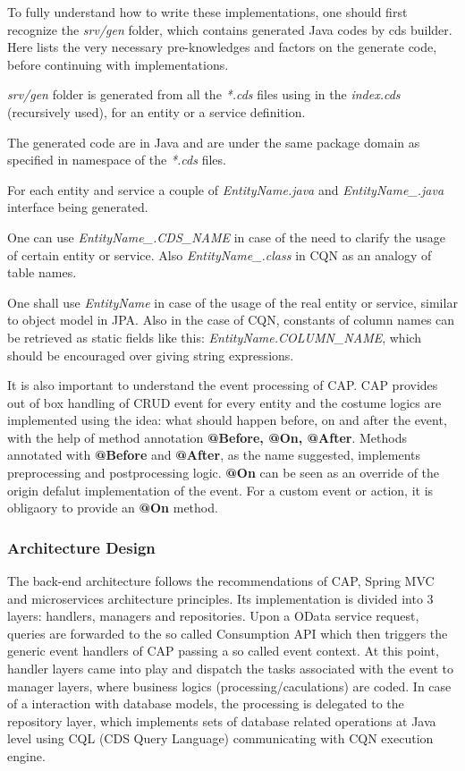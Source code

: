 To fully understand how to write these implementations, one should first recognize the \textit{srv/gen} folder, which contains generated Java codes by cds builder. Here lists the very necessary pre-knowledges and factors on the generate code, before continuing with implementations. 
\begin{compactenum}
	\item \textit{srv/gen} folder is generated from all the \textit{*.cds} files using in the \textit{index.cds} (recursively used), for an entity or a service definition.
    \item The generated code are in Java and are under the same package domain as specified in namespace of the \textit{*.cds} files.
    \item For each entity and service a couple of \textit{EntityName.java} and \textit{EntityName\_.java} interface being generated. 
    \item One can use \textit{EntityName\_.CDS\_NAME} in case of the need to clarify the usage of certain entity or service. Also \textit{EntityName\_.class} in CQN as an analogy of table names. 
    \item One shall use \textit{EntityName} in case of the usage of the real entity or service, similar to object model in JPA. Also in the case of CQN, constants of column names can be retrieved as static fields like this: \textit{EntityName.COLUMN\_NAME}, which should be encouraged over giving string expressions.
\end{compactenum}

\bigskip
It is also important to understand the event processing of CAP. CAP provides out of box handling of CRUD event for every entity and the costume logics are implemented using the idea: what should happen before, on and after the event, with the help of method annotation \textbf{@Before, @On, @After}. Methods annotated with \textbf{@Before} and \textbf{@After}, as the name suggested, implements preprocessing and postprocessing logic. \textbf{@On} can be seen as an override of the origin defalut implementation of the event. For a custom event or action, it is obligaory to provide an \textbf{@On} method.

\subsubsection{Architecture Design}

The back-end architecture follows the recommendations of CAP, Spring MVC and microservices architecture principles. Its implementation is divided into 3 layers: handlers, managers and repositories. Upon a OData service request, queries are forwarded to the so called Consumption API which then triggers the generic event handlers of CAP passing a so called event context. At this point, handler layers came into play and dispatch the tasks associated with the event to manager layers, where business logics (processing/caculations) are coded. In case of a interaction with database models, the processing is delegated to the repository layer, which implements sets of database related operations at Java level using CQL (CDS Query Language) communicating with CQN execution engine. 

